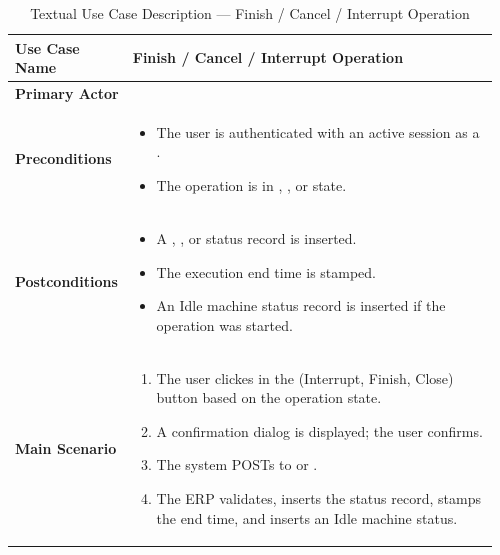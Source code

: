 \begin{longtable}{@{} P{0.21\linewidth} P{0.75\linewidth} @{}}
	\caption{Textual Use Case Description --- Finish / Cancel / Interrupt Operation}
	\label{tab:s3-uc-close-operation} \\
	\toprule
	\endfirsthead
	\midrule
	\endhead
	
	\bottomrule
	\endlastfoot
	
	\textbf{Use Case Name} & Finish / Cancel / Interrupt Operation \\
	\midrule
	\textbf{Primary Actor} &  \\
	\midrule
	\textbf{Preconditions} & 
	\begin{itemize}[nosep, leftmargin=*]
	\item The user is authenticated with an active session as a .
	\item The operation is in , , or  state.
	\end{itemize} \\
	\midrule
	\textbf{Postconditions} & 
	\begin{itemize}[nosep, leftmargin=*]
	\item A , , or  status record is inserted.
	\item The execution end time is stamped.
	\item An Idle machine status record is inserted if the operation was started.
	\end{itemize} \\
	\midrule
	\textbf{Main Scenario} & 
	\begin{enumerate}[nosep, leftmargin=*]
	\item The user clickes in the (Interrupt, Finish, Close) button based on the operation state.
	\item A confirmation dialog is displayed; the user confirms.
	\item The system POSTs to  or .
	\item The ERP validates, inserts the status record, stamps the end time, and inserts an Idle machine status.
	\end{enumerate} \\
\end{longtable}

